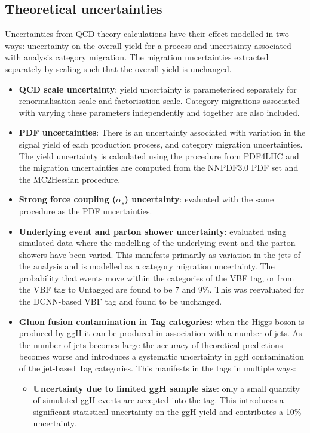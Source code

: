 \subsection{Theoretical uncertainties}
Uncertainties from QCD theory calculations have their effect modelled in two ways: uncertainty on the overall yield for a process and uncertainty associated with analysis category migration. 
The migration uncertainties extracted separately by scaling such that the overall yield is unchanged.  
\begin{itemize}[noitemsep]
    \item {\textbf{QCD scale uncertainty}: yield uncertainty is parameterised separately for renormalisation scale and factorisation scale. 
                                            Category migrations associated with varying these parameters independently and together are also included.}
    \item{\textbf{PDF uncertainties}: There is an uncertainty associated with variation in the signal yield of each production process, and category migration uncertainties.   
        The yield uncertainty is calculated using the procedure from PDF4LHC \cite{PDF4LHC} and the migration uncertainties are computed from the NNPDF3.0 PDF set \cite{NNPDF3} and the MC2Hessian \cite{MC2Hessian} procedure.}
    \item{\textbf{Strong force coupling ($\alpha_{s}$) uncertainty}: evaluated with the same procedure as the PDF uncertainties.}
    \item{\textbf{Underlying event and parton shower uncertainty}: evaluated using simulated data where the modelling of the underlying event and the parton showers have been varied. This manifests primarily as variation in the jets of the analysis and is modelled as a category migration uncertainty. The probability that events move within the categories of the VBF tag, or from the VBF tag to Untagged are found to be 7 and 9\%. This was reevaluated for the DCNN-based VBF tag and found to be unchanged.}
    \item{\textbf{Gluon fusion contamination in \ttH Tag categories}: when the Higgs boson is produced by ggH it can be produced in association with a number of jets. As the number of jets becomes large the accuracy of theoretical predictions becomes worse and introduces a systematic uncertainty in ggH contamination of the jet-based Tag categories. This manifests in the \ttH tags in multiple ways:
        \begin{itemize}[noitemsep]
            \item[\textbullet] \textbf{Uncertainty due to limited ggH sample size}: only a small quantity of simulated ggH events are accepted into the \ttH tag. This introduces a significant statistical uncertainty on the ggH yield and contributes a 10\% uncertainty.

\end{itemize}}
\end{itemize}
